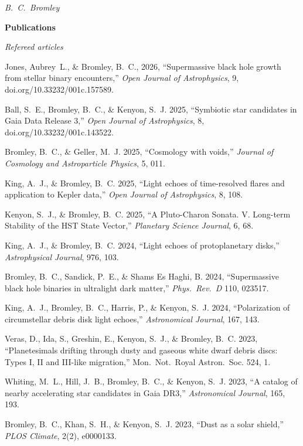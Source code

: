 \documentclass[11pt]{article}
\def\refitem{} %
\def\bibsty{\setlength{\parskip}{0pt}
\setlength{\oddsidemargin}{0.33in}
\setlength{\evensidemargin}{0.33in}
\setlength{\parindent}{-0.33in}}
\newcommand{\shead}[1]{\vspace{12.5pt}\centerline{{\bf{#1}}}}
\begin{document}
\newpage
\mbox{} \hfill {\it B.\ C.\ Bromley}
\vspace{-5.5pt}
\shead{Publications}
\vspace{-11pt}
\centerline{\em Refereed articles}
\bibsty

\vspace{5.5pt}

\refitem Jones, Aubrey~L., \& Bromley, B.~C., 2026, ``Supermassive black hole growth from stellar binary encounters,''
{\em Open Journal of Astrophysics}, 9, doi.org/10.33232/001c.157589.

\refitem Ball, S.~E., Bromley, B.~C., \& Kenyon, S.~J. 2025,
``Symbiotic star candidates in Gaia Data Release 3,''
{\em Open Journal of Astrophysics}, 8, doi.org/10.33232/001c.143522.

\refitem Bromley, B.~C., \& Geller, M.~J. 2025, 
``Cosmology with voids,''
{\em Journal of Cosmology and Astroparticle Physics}, 5, 011.

\refitem King, A.~J., \& Bromley, B.~C. 2025, ``Light echoes of
time-resolved flares and application to Kepler data,'' {\em Open Journal of Astrophysics}, 8, 108.

\refitem Kenyon, S.~J., \& Bromley, B.~C. 2025,
``A Pluto-Charon Sonata. V. Long-term Stability of the HST State Vector,''
{\em Planetary Science Journal}, 6, 68.

\refitem King, A.~J., \& Bromley, B.~C. 2024, ``Light echoes of protoplanetary disks,'' {\em Astrophysical Journal}, 976, 103.

\refitem Bromley, B.~C., Sandick, P.~E., \& Shams Es Haghi, B.  2024, ``Supermassive black hole binaries in ultralight dark matter,'' {\em Phys.~Rev.~D} 110, 023517.


\refitem King, A.~J., Bromley, B.~C., Harris, P., \& Kenyon, S.~J. 2024, ``Polarization of circumstellar debris disk light echoes,'' {\em Astronomical Journal}, 167, 143.

\refitem Veras, D., Ida, S., Greshin, E., Kenyon, S.~J., \& Bromley, B.~C. 2023, ``Planetesimals drifting through dusty and gaseous white dwarf debris discs: Types I, II and III-like migration,'' Mon.\ Not.\ Royal Astron.\ Soc. 524, 1.

\refitem Whiting, M.~L., Hill, J.~B., Bromley, B.~C., \& Kenyon, S.~J. 2023, ``A catalog of nearby accelerating star candidates in Gaia DR3,'' {\em Astronomical Journal}, 165, 193.

\refitem Bromley, B.~C., Khan, S.~H., \& Kenyon, S.~J. 2023, ``Dust as a solar shield,'' {\em PLOS Climate}, 2(2), e0000133. %
\end{document}
